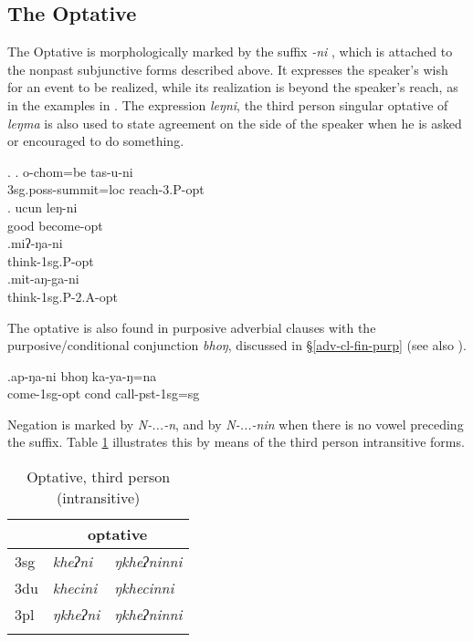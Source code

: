 	
\subsection{The Optative}

The Optative is morphologically marked by the suffix \emph{-ni} , which is attached to  the nonpast subjunctive forms described above. It expresses the speaker's wish for an event  to be realized, while its realization is beyond the speaker's reach, as in the examples in \Next. The expression \emph{leŋni}, the third person singular optative of \emph{leŋma}  is also used to state agreement on the side of the speaker when he is asked or encouraged to do something.
 
\ex. \ag. o-chom=be tas-u-ni\\
		{\sc 3sg.poss-}summit{\sc =loc} reach{\sc -3.P-opt}	\\
	 \bg. ucun leŋ-ni\\ 
		good become{\sc [3sg]-opt}	\\
	 \bg.miʔ-ŋa-ni\\
  think{\sc -1sg.P-opt}\\
   \bg.mit-aŋ-ga-ni\\
  think{\sc -1sg.P-2.A-opt}\\
  
The optative is also found in purposive adverbial clauses with the purposive/conditional conjunction \emph{bhoŋ}, discussed in §\ref{adv-cl-fin-purp} (see also \Next). 

\exg.ap-ŋa-ni bhoŋ ka-ya-ŋ=na\\
come{\sc -1sg-opt} {\sc cond} call{\sc -pst-1sg=sg}\\

Negation is marked by \emph{N-...-n}, and by \emph{N-...-nin} when there is no vowel preceding the suffix. Table \ref{par-opt-intr} illustrates this by means of the third person intransitive forms.

\begin{table}[htp]
\begin{center}
\begin{tabular}{lll}
\lsptoprule
&\multicolumn{2}{c}{{\sc optative}}\\
\midrule
		{\sc 3sg} & \it kheʔni& \it ŋkheʔninni\\
 		{\sc 3du} & \it khecini& \it ŋkhecinni\\
		{\sc 3pl} & \it ŋkheʔni& \it ŋkheʔninni\\
\lspbottomrule	
\end{tabular}
\end{center}
\caption{Optative, third person (intransitive)}\label{par-opt-intr}
\end{table}


